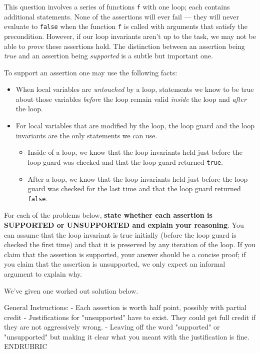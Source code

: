 \clearpage
{}

This question involves a series of functions \lstinline'f' with one
loop; each contains additional \assert{} statements. None of the
assertions will ever fail --- they will never evaluate to
\lstinline'false' when the function \lstinline'f' is called with
arguments that satisfy the precondition. However, if our loop
invariants aren't up to the task, we may not be able to \emph{prove}
these assertions hold. The distinction between an assertion being
\emph{true} and an assertion being \emph{supported} is a subtle but
important one.

To support an assertion one may use the following facts:
\begin{itemize}
\item%
  When local variables are \emph{untouched} by a loop, statements we
  know to be true about those variables \emph{before} the loop remain
  valid \emph{inside} the loop and \emph{after} the loop.

\item%
  For local variables that are modified by the loop, the loop guard
  and the loop invariants are the only statements we can use.
  \begin{itemize}
  \item%
    Inside of a loop, we know that the loop invariants held just before the
    loop guard was checked and that the loop guard returned \lstinline'true'.
  \item%
    After a loop, we know that the loop invariants held just before the loop
    guard was checked for the last time and that the loop guard returned
    \lstinline'false'.
  \end{itemize}
\end{itemize}

For each of the problems below, \textbf{state whether each assertion
is SUPPORTED or UNSUPPORTED and explain your reasoning}.
You can assume that the
loop invariant is true initially (before the loop guard is checked the
first time) and that it is preserved by any iteration of the loop. If
you claim that the assertion is supported, your answer should be a
concise proof; if you claim that the assertion is unsupported, we only
expect an informal argument to explain why.

We've given one worked out solution below.


\newpage


\RUBRIC
General Instructions:
  - Each assertion is worth half point, possibly with partial credit
  - Justifications for "unsupported" have to exist. They could get full
    credit if they are not aggressively wrong.
  - Leaving off the word "supported" or "unsupported" but making it
    clear what you meant with the justification is fine.
ENDRUBRIC

